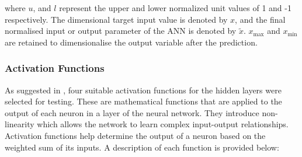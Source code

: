 where $u$, and $l$ represent the upper and lower normalized unit values of 1 and -1 respectively. The dimensional target input value is denoted by $x$, and the final normalised input or output parameter of the ANN is denoted by $\tilde{x}$. $x_{\max }$ and $x_{\min }$ are retained to dimensionalise the output variable after the prediction.

\subsubsection{Activation Functions} \label{Activation functions}

As suggested in \cite{Marian2022}, four suitable activation functions for the hidden layers were selected for testing. These are mathematical functions that are applied to the output of each neuron in a layer of the neural network. They introduce non-linearity which allows the network to learn complex input-output relationships. Activation functions help determine the output of a neuron based on the weighted sum of its inputs. A description of each function is provided below:

